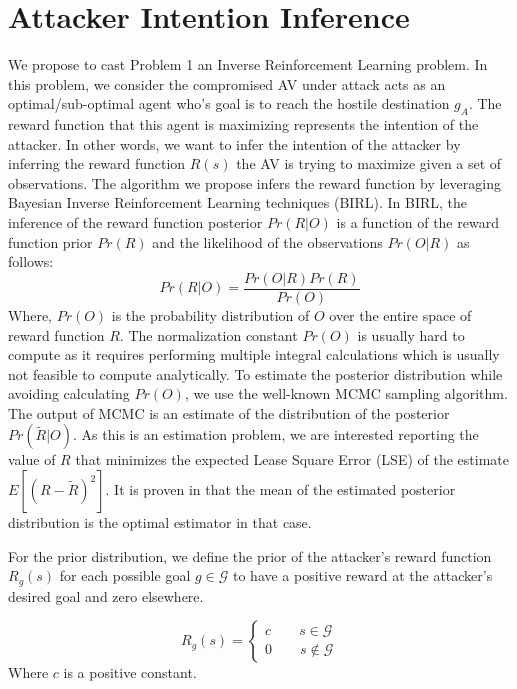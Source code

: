 \documentclass[conference]{IEEEtran}
\begin{document}
\section{Attacker Intention Inference}\label{sec:intpredic}
We propose to cast Problem 1 an Inverse Reinforcement Learning problem. In this problem, we consider the compromised AV under attack acts as an optimal/sub-optimal agent who's goal is to reach the hostile destination $g_A$. The reward function that this agent is maximizing represents the intention of the attacker. In other words, we want to infer the intention of the attacker by inferring the reward function $R(s)$ the AV is trying to maximize given a set of observations. The algorithm we propose infers the reward function by leveraging Bayesian Inverse Reinforcement Learning techniques (BIRL)\cite{Ramachandran2007}. In BIRL, the inference of the reward function posterior $Pr(R|O)$ is a function of the reward function prior $Pr(R)$ and the likelihood of the observations $Pr(O|R)$ as follows:
\begin{equation} 
    Pr(R|O) = \frac{Pr(O|R)Pr(R)}{Pr(O)}
\end{equation}
Where, $Pr(O)$ is the probability distribution of $O$ over the entire space of reward function $R$. The normalization constant $Pr(O)$ is usually hard to compute as it requires performing multiple integral calculations which is usually not feasible to compute analytically. To estimate the posterior distribution while avoiding calculating $Pr(O)$, we use the well-known MCMC sampling algorithm. The output of MCMC is an estimate of the distribution of the posterior $Pr(\tilde{R}|O)$. As this is an estimation problem, we are interested reporting the value of $R$ that minimizes the expected Lease Square Error (LSE) of the estimate $E[(R-\tilde{R})^2]$. It is proven in \cite{Ramachandran2007} that the mean of the estimated posterior distribution is the optimal estimator in that case.

For the prior distribution, we define the prior of the attacker's reward function $R_g(s)$ for each possible goal $g \in \mathcal{G}$ to have a positive reward at the attacker's desired goal and zero elsewhere. 

  \begin{equation}
    R_g(s)=\left\{
                \begin{array}{ll}
                  c\hspace{2em} s\in \mathcal{G}\\
                  0\hspace{2em} s\notin \mathcal{G}
                \end{array}
              \right.
  \end{equation}
Where $c$ is a positive constant.
\end{document}

